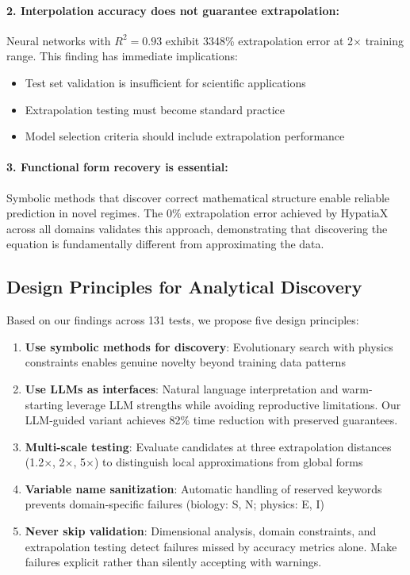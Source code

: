 \documentclass[twoside,11pt]{article}
\begin{document}
\paragraph{2. Interpolation accuracy does not guarantee extrapolation:}

Neural networks with $R^2 = 0.93$ exhibit 3348\% extrapolation error at 2$\times$ training range. This finding has immediate implications:
\begin{itemize}
\item Test set validation is insufficient for scientific applications
\item Extrapolation testing must become standard practice
\item Model selection criteria should include extrapolation performance
\end{itemize}

\paragraph{3. Functional form recovery is essential:}

Symbolic methods that discover correct mathematical structure enable reliable prediction in novel regimes. The 0\% extrapolation error achieved by HypatiaX across all domains validates this approach, demonstrating that discovering the equation is fundamentally different from approximating the data.

\subsection{Design Principles for Analytical Discovery}

Based on our findings across 131 tests, we propose five design principles:

\begin{enumerate}
\item \textbf{Use symbolic methods for discovery}: Evolutionary search with physics constraints enables genuine novelty beyond training data patterns

\item \textbf{Use LLMs as interfaces}: Natural language interpretation and warm-starting leverage LLM strengths while avoiding reproductive limitations. Our LLM-guided variant achieves 82\% time reduction with preserved guarantees.

\item \textbf{Multi-scale testing}: Evaluate candidates at three extrapolation distances (1.2$\times$, 2$\times$, 5$\times$) to distinguish local approximations from global forms

\item \textbf{Variable name sanitization}: Automatic handling of reserved keywords prevents domain-specific failures (biology: S, N; physics: E, I)

\item \textbf{Never skip validation}: Dimensional analysis, domain constraints, and extrapolation testing detect failures missed by accuracy metrics alone. Make failures explicit rather than silently accepting with warnings.
\end{enumerate}
\end{document}
